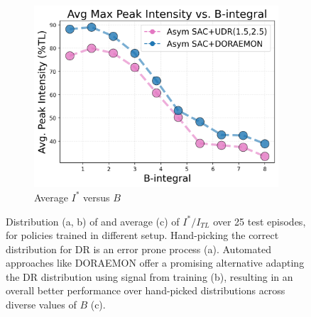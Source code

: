 \begin{figure}
    \hfill
    \begin{subfigure}[b]{0.32\textwidth}
        \centering
        \includegraphics[width=\linewidth]{images/udr_vs_doraemon_average.png}
        \caption{Average \( I^* \) versus \( B \)}
        \label{fig:doraemon_outperforms_udr_scatter}
    \end{subfigure}
    \caption{Distribution (a, b) of and average (c) of \( I^*/I_{TL} \) over 25 test episodes, for policies trained in different setup. Hand-picking the correct distribution for DR is an error prone process (a). Automated approaches like DORAEMON offer a promising alternative adapting the DR distribution using signal from training (b), resulting in an overall better performance over hand-picked distributions across diverse values of \( B \) (c).}
    \label{fig:max_intensity_vs_b_integral}
\end{figure}

